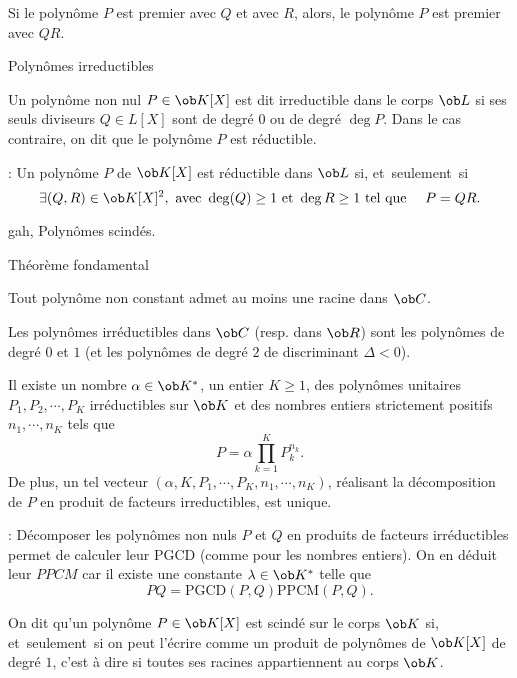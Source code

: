 \Propriete []  Si le polyn\^ome $P$ est premier avec $Q$ et avec $R$, alors, le polyn\^ome $P$ est premier avec $QR$. 
\bigskip

\Concept [] Polyn\^omes irreductibles

\Definition []  Un polyn\^ome non nul $P\in\ob K[X]$ est dit irreductible dans le corps $\ob L$ si ses seuls diviseurs $Q\in L[X]$ sont de degr\'e $0$ 
ou de degr\'e $\deg P$. Dans le cas contraire, on dit que le polyn\^ome $P$ est r\'eductible. 
\bigskip

\Remarque : Un polyn\^ome $P$ de $\ob K[X]$ est r\'eductible dans $\ob L$ si, et~seulement~si 
$$
\exists(Q,R)\in\ob K[X]^2, \mbox{ avec }\deg(Q)\ge1\mbox{ et } \deg R\ge1\mbox{ tel que }\quad P=QR.
$$
\medskip

\Subsection gah, Polyn\^omes scind\'es.

\Concept [] Th\'eor\`eme fondamental

\Theoreme [Index=Theoreme@Th\'eor\`eme!de d'Alembert;Title=Th\'eor\`eme de d'Alembert-Gauss]  
Tout polyn\^ome non constant admet au moins une racine dans $\ob C$. 

\Propriete []  Les polyn\^omes irr\'eductibles dans $\ob C$ (resp. dans $\ob R$) sont les polyn\^omes de degr\'e $0$ et $1$ (et les polyn\^omes de degr\'e $2$ de discriminant $\Delta<0$). 
\bigskip

\Theoreme [Title=D\'ecomposition en facteurs irr\'eductibles;$P$ polyn\^ome non constant \`a coefficients dans $\ob K$ ] 
Il existe un nombre $\alpha\in\ob K^*$, un entier $K\ge1$, des polyn\^omes unitaires $P_1,P_2,\cdots, P_K$ irr\'eductibles sur $\ob K$ et des nombres entiers strictement positifs $n_1,\cdots, n_K$ tels que 
$$
P=\alpha\prod_{k=1}^K P_k^{n_k}. 
$$
De plus, un tel vecteur $(\alpha, K,P_1,\cdots, P_K, n_1,\cdots,n_K)$, r\'ealisant la d\'ecomposition de $P$ en produit de facteurs irreductibles, est unique. 

\Remarque : D\'ecomposer les polyn\^omes non nuls $P$ et $Q$ en produits de facteurs irr\'eductibles permet de calculer leur PGCD (comme pour les nombres entiers). 
On en d\'eduit leur $PPCM$ car il existe une constante $\lambda\in\ob K^*$ telle que 
$$
PQ=\mbox{PGCD}(P,Q)\mbox{PPCM}(P,Q).
$$

\Definition []  On dit qu'un polyn\^ome $P\in\ob K[X]$ est scind\'e sur le corps $\ob K$ si, et~seulement~si on peut l'\'ecrire comme un produit de polyn\^omes de $\ob K[X]$ de degr\'e $1$, c'est \`a dire si toutes ses racines appartiennent au corps $\ob K$. 
\bigskip

